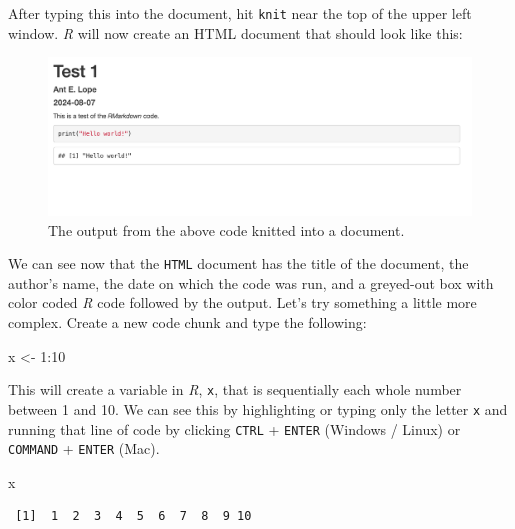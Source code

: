 \documentclass[
  letterpaper,
  DIV=11,
  numbers=noendperiod]{scrreprt}
\newenvironment{Shaded}{\begin{snugshade}}{\end{snugshade}}
\newcommand{\DecValTok}[1]{\textcolor[rgb]{0.68,0.00,0.00}{#1}}
\newcommand{\NormalTok}[1]{\textcolor[rgb]{0.00,0.23,0.31}{#1}}
\newcommand{\OtherTok}[1]{\textcolor[rgb]{0.00,0.23,0.31}{#1}}
\newcommand{\SpecialCharTok}[1]{\textcolor[rgb]{0.37,0.37,0.37}{#1}}
\begin{document}
After typing this into the document, hit \texttt{knit} near the top of
the upper left window. \emph{R} will now create an HTML document that
should look like this:

\begin{figure}[H]

{\centering \includegraphics{images/test1.png}

}

\caption{The output from the above code knitted into a document.}

\end{figure}%

We can see now that the \texttt{HTML} document has the title of the
document, the author's name, the date on which the code was run, and a
greyed-out box with color coded \emph{R} code followed by the output.
Let's try something a little more complex. Create a new code chunk and
type the following:

\begin{Shaded}
\begin{Highlighting}[]
\NormalTok{x }\OtherTok{\textless{}{-}} \DecValTok{1}\SpecialCharTok{:}\DecValTok{10}
\end{Highlighting}
\end{Shaded}

This will create a variable in \emph{R}, \texttt{x}, that is
sequentially each whole number between 1 and 10. We can see this by
highlighting or typing only the letter \texttt{x} and running that line
of code by clicking \texttt{CTRL} + \texttt{ENTER} (Windows / Linux) or
\texttt{COMMAND} + \texttt{ENTER} (Mac).

\begin{Shaded}
\begin{Highlighting}[]
\NormalTok{x}
\end{Highlighting}
\end{Shaded}

\begin{verbatim}
 [1]  1  2  3  4  5  6  7  8  9 10
\end{verbatim}
\end{document}
